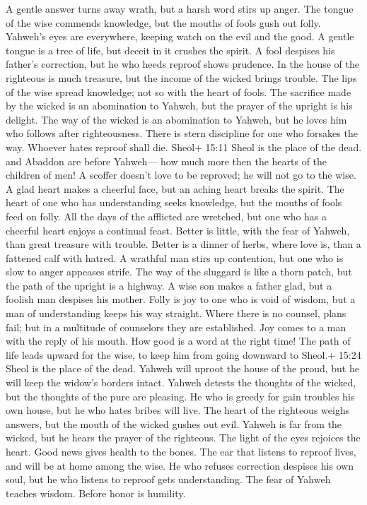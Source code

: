  A gentle answer turns away wrath, but a harsh word stirs up
anger.  The tongue of the wise commends knowledge, but the
mouths of fools gush out folly.  Yahweh's eyes are
everywhere, keeping watch on the evil and the good.  A
gentle tongue is a tree of life, but deceit in it crushes the spirit.
 A fool despises his father's correction, but he who heeds
reproof shows prudence.  In the house of the righteous is
much treasure, but the income of the wicked brings trouble. 
The lips of the wise spread knowledge; not so with the heart of fools.
 The sacrifice made by the wicked is an abomination to
Yahweh, but the prayer of the upright is his delight.  The
way of the wicked is an abomination to Yahweh, but he loves him who
follows after righteousness.  There is stern discipline for
one who forsakes the way. Whoever hates reproof shall die. 
Sheol+ 15:11 Sheol is the place of the dead. and Abaddon are before
Yahweh--- how much more then the hearts of the children of men!
 A scoffer doesn't love to be reproved; he will not go to
the wise.  A glad heart makes a cheerful face, but an
aching heart breaks the spirit.  The heart of one who has
understanding seeks knowledge, but the mouths of fools feed on folly.
 All the days of the afflicted are wretched, but one who
has a cheerful heart enjoys a continual feast.  Better is
little, with the fear of Yahweh, than great treasure with trouble.
 Better is a dinner of herbs, where love is, than a
fattened calf with hatred.  A wrathful man stirs up
contention, but one who is slow to anger appeases strife. 
The way of the sluggard is like a thorn patch, but the path of the
upright is a highway.  A wise son makes a father glad, but
a foolish man despises his mother.  Folly is joy to one who
is void of wisdom, but a man of understanding keeps his way straight.
 Where there is no counsel, plans fail; but in a multitude
of counselors they are established.  Joy comes to a man
with the reply of his mouth. How good is a word at the right time!
 The path of life leads upward for the wise, to keep him
from going downward to Sheol.+ 15:24 Sheol is the place of the dead.
 Yahweh will uproot the house of the proud, but he will
keep the widow's borders intact.  Yahweh detests the
thoughts of the wicked, but the thoughts of the pure are pleasing.
 He who is greedy for gain troubles his own house, but he
who hates bribes will live.  The heart of the righteous
weighs answers, but the mouth of the wicked gushes out evil.
 Yahweh is far from the wicked, but he hears the prayer of
the righteous.  The light of the eyes rejoices the heart.
Good news gives health to the bones.  The ear that listens
to reproof lives, and will be at home among the wise.  He
who refuses correction despises his own soul, but he who listens to
reproof gets understanding.  The fear of Yahweh teaches
wisdom. Before honor is humility.

